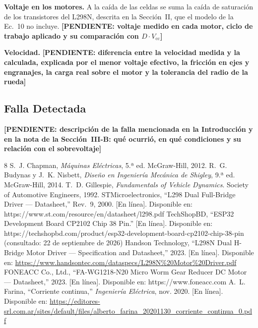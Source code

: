\documentclass[conference]{IEEEtran}
\newcommand{\pendiente}[1]{\textbf{[PENDIENTE: #1]}}
\begin{document}
\textbf{Voltaje en los motores.} A la caída de las celdas se suma la caída de saturación de los transistores del L298N, descrita en la Sección~II, que el modelo de la Ec.~10 no incluye. \pendiente{voltaje medido en cada motor, ciclo de trabajo aplicado y su comparación con $D \cdot V_{\text{cc}}$}

\textbf{Velocidad.} \pendiente{diferencia entre la velocidad medida y la calculada, explicada por el menor voltaje efectivo, la fricción en ejes y engranajes, la carga real sobre el motor y la tolerancia del radio de la rueda}

\subsection{Falla Detectada}
\pendiente{descripción de la falla mencionada en la Introducción y en la nota de la Sección~III-B: qué ocurrió, en qué condiciones y su relación con el sobrevoltaje}

\begin{thebibliography}{8}
 S.~J. Chapman, \emph{Máquinas Eléctricas}, 5.ª ed. McGraw-Hill, 2012.
 R.~G. Budynas y J.~K. Nisbett, \emph{Diseño en Ingeniería Mecánica de Shigley}, 9.ª ed. McGraw-Hill, 2014.
 T.~D. Gillespie, \emph{Fundamentals of Vehicle Dynamics}. Society of Automotive Engineers, 1992.
 STMicroelectronics, ``L298 Dual Full-Bridge Driver --- Datasheet,'' Rev.~9, 2000. [En línea]. Disponible en: https://www.st.com/resource/en/datasheet/l298.pdf
 TechShopBD, ``ESP32 Development Board CP2102 Chip 38 Pin.'' [En línea]. Disponible en: https://techshopbd.com/product/esp32-development-board-cp2102-chip-38-pin (consultado: 22 de septiembre de 2026)
 Handson Technology, ``L298N Dual H-Bridge Motor Driver --- Specification and Datasheet,'' 2023. [En línea]. Disponible en: \url{https://www.handsontec.com/dataspecs/L298N%20Motor%20Driver.pdf}
 FONEACC Co., Ltd., ``FA-WG1218-N20 Micro Worm Gear Reducer DC Motor --- Datasheet,'' 2023. [En línea]. Disponible en: https://www.foneacc.com
 A.~L. Farina, ``Corriente continua,'' \emph{Ingeniería Eléctrica}, nov. 2020. [En línea]. Disponible en: \url{https://editores-srl.com.ar/sites/default/files/alberto_farina_20201130_corriente_continua_0.pdf}
\end{thebibliography}
\end{document}
